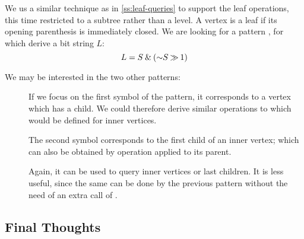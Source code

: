 \bigbreak

We us a similar technique as in \ref{ss:leaf-queries} to support the leaf operations, this time restricted to a subtree rather than a level.
A vertex is a leaf if its opening parenthesis is immediately closed.
We are looking for a pattern \str{()}, for which derive a bit string $L$:
$$L = S \mathbin{\&} (\mathord{\sim} S \mathbin{\gg} 1)$$

\begin{algorithmic}
		\State {}
	\Else
		\State {}
	\EndIf
\EndFunction
\end{algorithmic}

\begin{algorithmic}	
 
		\State {}
	\Else
		\State {}
	\EndIf
\EndFunction
\end{algorithmic}

\begin{algorithmic}
		\State {}
	\Else
		\State {}
	\EndIf
\EndFunction
\end{algorithmic}

\bigbreak

We may be interested in the two other patterns:
\begin{description}
	\item[\str{((}]
	If we focus on the first symbol of the pattern, it corresponds to a vertex which has a child.
	We could therefore derive similar operations to \leafAny{} which would be defined for inner vertices.
	
	The second symbol corresponds to the first child of an inner vertex; which can also be obtained by \childFirst{} operation applied to its parent.
	
	\item[\str{))}]
	Again, it can be used to query inner vertices or last children.
	It is less useful, since the same can be done by the previous pattern without the need of an extra call of \findOpen{}.
\end{description}

\subsection{Final Thoughts}

